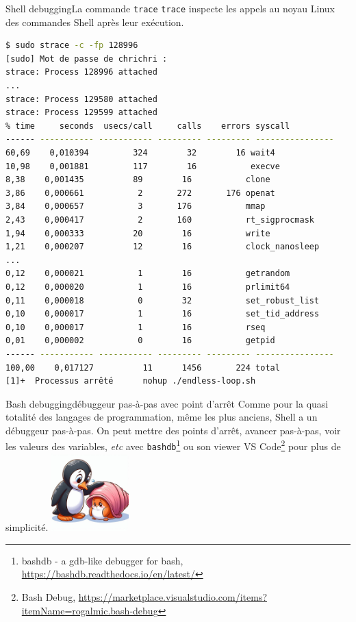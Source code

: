 \documentclass{beamer}
\begin{document}
    \begin{frame}[fragile]{Shell debugging}{La commande \lstinline{trace}}
        \lstinline{trace} inspecte les appels au noyau Linux des commandes Shell après leur exécution.
        \begin{lstlisting}[language=bash,basicstyle=\tiny\ttfamily]
$ sudo strace -c -fp 128996
[sudo] Mot de passe de chrichri :
strace: Process 128996 attached
...
strace: Process 129580 attached
strace: Process 129599 attached
% time     seconds  usecs/call     calls    errors syscall
------ ----------- ----------- --------- --------- ----------------
60,69    0,010394         324        32        16 wait4
10,98    0,001881         117        16           execve
8,38    0,001435          89        16           clone
3,86    0,000661           2       272       176 openat
3,84    0,000657           3       176           mmap
2,43    0,000417           2       160           rt_sigprocmask
1,94    0,000333          20        16           write
1,21    0,000207          12        16           clock_nanosleep
...
0,12    0,000021           1        16           getrandom
0,12    0,000020           1        16           prlimit64
0,11    0,000018           0        32           set_robust_list
0,10    0,000017           1        16           set_tid_address
0,10    0,000017           1        16           rseq
0,01    0,000002           0        16           getpid
------ ----------- ----------- --------- --------- ----------------
100,00    0,017127          11      1456       224 total
[1]+  Processus arrêté      nohup ./endless-loop.sh
        \end{lstlisting}
    \end{frame}

    \begin{frame}{Bash debugging}{débuggeur pas-à-pas avec point d'arrêt}
        Comme pour la quasi totalité des langages de programmation, même les plus anciens, Shell a un débuggeur pas-à-pas.
        \bigbreak
        On peut mettre des points d'arrêt, avancer pas-à-pas, voir les valeurs des variables, \textit{etc} avec \lstinline{bashdb}\footnote{bashdb - a gdb-like debugger for bash, \url{https://bashdb.readthedocs.io/en/latest/}} ou son viewer VS Code\footnote{\label{bash-debug}Bash Debug, \url{https://marketplace.visualstudio.com/items?itemName=rogalmic.bash-debug}} pour plus de simplicité.
        \bigbreak
        \centering
        \includegraphics[width=3cm]{image/tux-reassure-shell}
    \end{frame}
\end{document}
